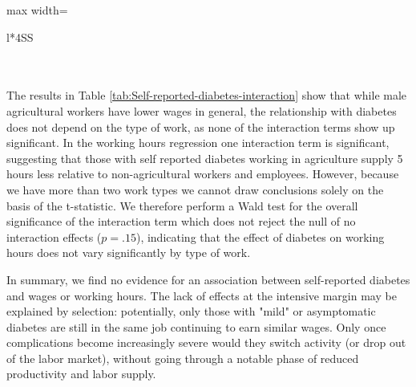 \documentclass[12pt,english]{article}
\begin{document}
{\begin{table}[!ht]
\begin{center}
\begin{adjustbox}{max width=\textwidth}
{\begin{tabular}{l*{4}{SS}}
\\
\\
\\
\end{tabular}
}
\end{adjustbox}
\end{center}
\end{table}  

\FloatBarrier
  
The results in Table \ref{tab:Self-reported-diabetes-interaction} show that while male agricultural workers have lower wages in general, the relationship with diabetes does not depend on the type of work, as none of the interaction terms show up significant. In the working hours regression one interaction term is significant, suggesting that those with self reported diabetes working in agriculture supply 5 hours less relative to non-agricultural workers and employees. However, because we have more than two work types we cannot draw conclusions
solely on the basis of the t-statistic. We therefore perform a Wald test for the overall significance of the interaction term which does
not reject the null of no interaction effects ($p = .15$), indicating that the effect of diabetes on working hours does not vary significantly by type of work. 

In summary, we find no evidence for an association between self-reported diabetes and wages or working hours. The lack of effects at the intensive margin may be explained by selection: potentially, only those with "mild" or asymptomatic diabetes are still in the same job continuing to earn similar wages. Only once complications become increasingly severe would they switch activity (or drop out of the labor market), without going through a notable phase of reduced productivity and labor supply.

}
\end{document}
